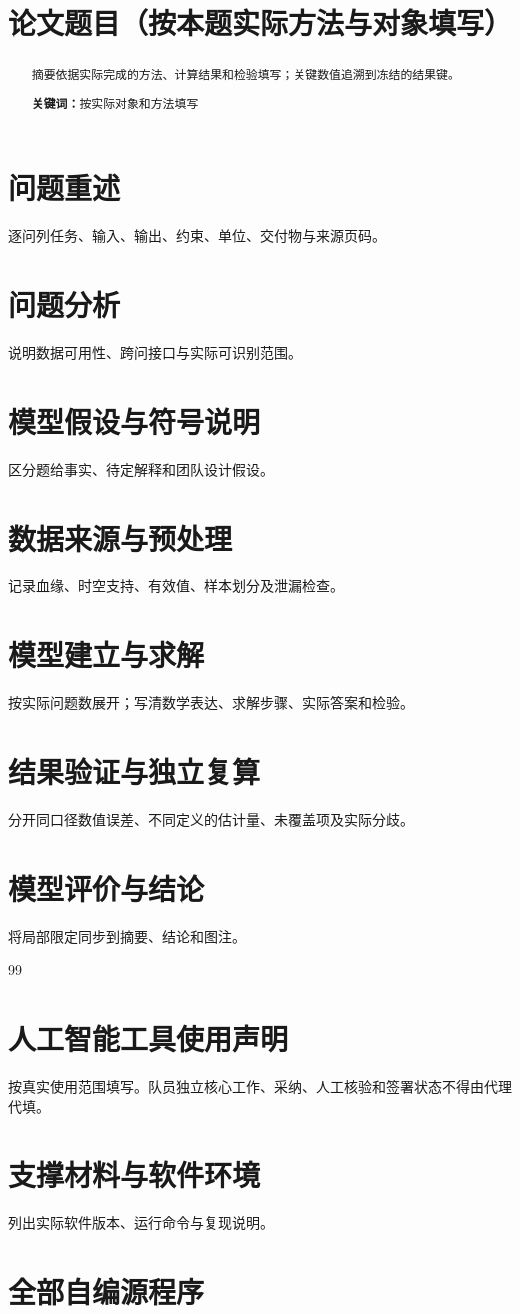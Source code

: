 \documentclass[UTF8,a4paper,12pt]{ctexart}
\title{论文题目（按本题实际方法与对象填写）}
\author{}
\date{}
\begin{document}
\maketitle
\thispagestyle{empty}
\begin{abstract}
摘要依据实际完成的方法、计算结果和检验填写；关键数值追溯到冻结的结果键。
\par\noindent\textbf{关键词：}按实际对象和方法填写
\end{abstract}
\clearpage
\tableofcontents
\clearpage
\pagestyle{plain}
\section{问题重述}
逐问列任务、输入、输出、约束、单位、交付物与来源页码。
\section{问题分析}
说明数据可用性、跨问接口与实际可识别范围。
\section{模型假设与符号说明}
区分题给事实、待定解释和团队设计假设。
\section{数据来源与预处理}
记录血缘、时空支持、有效值、样本划分及泄漏检查。
\section{模型建立与求解}
按实际问题数展开；写清数学表达、求解步骤、实际答案和检验。
\section{结果验证与独立复算}
分开同口径数值误差、不同定义的估计量、未覆盖项及实际分歧。
\section{模型评价与结论}
将局部限定同步到摘要、结论和图注。
\begin{thebibliography}{99}
\end{thebibliography}
\section*{人工智能工具使用声明}
按真实使用范围填写。队员独立核心工作、采纳、人工核验和签署状态不得由代理代填。
\appendix
\section{支撑材料与软件环境}
% 
列出实际软件版本、运行命令与复现说明。
\section{全部自编源程序}
\end{document}
